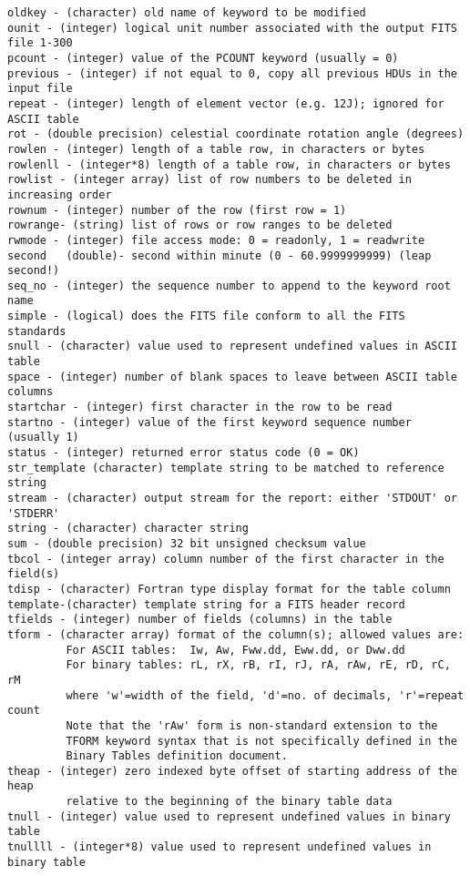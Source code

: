 \documentclass[11pt]{book}
\begin{document}
\begin{verbatim}
oldkey - (character) old name of keyword to be modified
ounit - (integer) logical unit number associated with the output FITS file 1-300
pcount - (integer) value of the PCOUNT keyword (usually = 0)
previous - (integer) if not equal to 0, copy all previous HDUs in the input file
repeat - (integer) length of element vector (e.g. 12J); ignored for ASCII table
rot - (double precision) celestial coordinate rotation angle (degrees)
rowlen - (integer) length of a table row, in characters or bytes
rowlenll - (integer*8) length of a table row, in characters or bytes
rowlist - (integer array) list of row numbers to be deleted in increasing order
rownum - (integer) number of the row (first row = 1)
rowrange- (string) list of rows or row ranges to be deleted
rwmode - (integer) file access mode: 0 = readonly, 1 = readwrite
second   (double)- second within minute (0 - 60.9999999999) (leap second!)
seq_no - (integer) the sequence number to append to the keyword root name
simple - (logical) does the FITS file conform to all the FITS standards
snull - (character) value used to represent undefined values in ASCII table
space - (integer) number of blank spaces to leave between ASCII table columns
startchar - (integer) first character in the row to be read
startno - (integer) value of the first keyword sequence number (usually 1)
status - (integer) returned error status code (0 = OK)
str_template (character) template string to be matched to reference string
stream - (character) output stream for the report: either 'STDOUT' or 'STDERR'
string - (character) character string
sum - (double precision) 32 bit unsigned checksum value
tbcol - (integer array) column number of the first character in the field(s)
tdisp - (character) Fortran type display format for the table column
template-(character) template string for a FITS header record
tfields - (integer) number of fields (columns) in the table
tform - (character array) format of the column(s); allowed values are:
         For ASCII tables:  Iw, Aw, Fww.dd, Eww.dd, or Dww.dd
         For binary tables: rL, rX, rB, rI, rJ, rA, rAw, rE, rD, rC, rM
         where 'w'=width of the field, 'd'=no. of decimals, 'r'=repeat count
         Note that the 'rAw' form is non-standard extension to the
         TFORM keyword syntax that is not specifically defined in the
         Binary Tables definition document.
theap - (integer) zero indexed byte offset of starting address of the heap
         relative to the beginning of the binary table data
tnull - (integer) value used to represent undefined values in binary table
tnullll - (integer*8) value used to represent undefined values in binary table

\end{verbatim}
\end{document}
